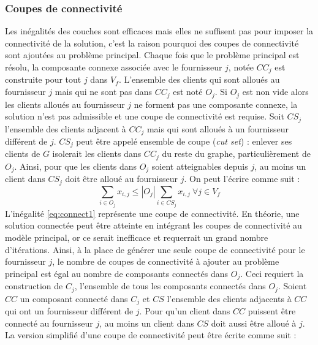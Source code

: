 \documentclass[12pt,a4paper]{article}
\begin{document}
\begin{multicols}{2}
\subsubsection*{Coupes de connectivité}
Les inégalités des couches sont efficaces mais elles ne suffisent pas pour imposer la connectivité de la solution, c'est la raison pourquoi des coupes de connectivité sont ajoutées au problème principal. \newline \indent
Chaque fois que le problème principal est résolu, la composante connexe associée avec le fournisseur $j$, notée $CC_{j}$ est construite pour tout $j$ dans $V_{f}$. L'ensemble des clients qui sont alloués au fournisseur $j$ mais qui ne sont pas dans $CC_{j}$ est noté $O_{j}$.\newline \indent
Si $O_{j}$ est non vide alors les clients alloués au fournisseur $j$ ne forment pas une composante connexe, la solution n'est pas admissible et une coupe de connectivité est requise. Soit $CS_{j}$ l'ensemble des clients adjacent à $CC_{j}$ mais qui sont alloués à un fournisseur différent de $j$. $CS_{j}$ peut être appelé ensemble de coupe (\textit{cut set}) : enlever ses clients de $G$ isolerait les clients dans $CC_{j}$ du reste du graphe, particulièrement de $O_{j}$. Ainsi, pour que les clients dans $O_{j}$ soient atteignables depuis $j$, au moins un client dans $CS_{j}$ doit être alloué au fournisseur $j$. On peut l'écrire comme suit : 
\begin{equation}\label{eq:connect1}
\sum_{i \in O_{j}}{x_{i,j}} \leq |O_{j}|\sum_{i \in CS_{j}}{x_{i,j}} \ \forall j \in V_{f}
\end{equation}
L'inégalité \eqref{eq:connect1} représente une coupe de connectivité. En théorie, une solution connectée peut être atteinte en intégrant les coupes de connectivité au modèle principal, or ce serait inefficace et requerrait un grand nombre d'itérations. Ainsi, à la place de générer une seule coupe de connectivité pour le fournisseur $j$, le nombre de coupes de connectivité à ajouter au problème principal est égal au nombre de composants connectés dans $O_{j}$. Ceci requiert la construction de $C_{j}$, l'ensemble de tous les composants connectés dans $O_{j}$. Soient $CC$ un composant connecté dans $C_{j}$ et $CS$ l'ensemble des clients adjacents à $CC$  qui ont un fournisseur différent de $j$. Pour qu'un client dans $CC$ puissent être connecté au fournisseur $j$, au moins un client dans $CS$ doit aussi être alloué à $j$. La version simplifié d'une coupe de connectivité peut être écrite comme suit :
\begin{align*}

\end{align*}
\end{multicols}
\end{document}
